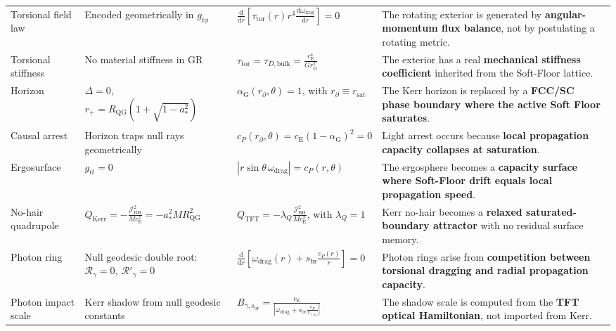 \begin{longtable}{@{} p{3cm} p{4.5cm} p{4.5cm} p{4cm} @{}}
Torsional field law & Encoded geometrically in $g_{t\phi}$ & $\frac{\mathrm{d}}{\mathrm{d}r}\left[\tau_{\mathrm{tor}}(r)r^4\frac{\mathrm{d}\omega_{\mathrm{drag}}}{\mathrm{d}r}\right]=0$ & The rotating exterior is generated by \textbf{angular-momentum flux balance}, not by postulating a rotating metric. \\

Torsional stiffness & No material stiffness in GR & $\tau_{\mathrm{tor}} = \tau_{D,\mathrm{bulk}} = \frac{c_{\mathrm{E}}^4}{G r_{\mathrm{D}}^2}$ & The exterior has a real \textbf{mechanical stiffness coefficient} inherited from the Soft-Floor lattice. \\

Horizon & $\Delta=0$, \newline $r_+=R_{\mathrm{QG}}\left(1+\sqrt{1-a_\ast^2}\right)$ & $\alpha_{\mathrm{G}}(r_{\partial},\theta)=1$, with $r_{\partial}\equiv r_{\mathrm{sat}}$ & The Kerr horizon is replaced by a \textbf{FCC/SC phase boundary where the active Soft Floor saturates}. \\

Causal arrest & Horizon traps null rays geometrically & $c_P(r_{\partial},\theta) = c_{\mathrm{E}}(1-\alpha_{\mathrm{G}})^2 = 0$ & Light arrest occurs because \textbf{local propagation capacity collapses at saturation}. \\

Ergosurface & $g_{tt}=0$ & $\left|r\sin\theta\,\omega_{\mathrm{drag}}\right| = c_P(r,\theta)$ & The ergosphere becomes a \textbf{capacity surface where Soft-Floor drift equals local propagation speed}. \\

No-hair quadrupole & $Q_{\mathrm{Kerr}} = -\frac{\mathcal{J}_{\mathrm{BH}}^2}{M c_{\mathrm{E}}^2} = -a_\ast^2 M R_{\mathrm{QG}}^2$ & $Q_{\mathrm{TFT}} = -\lambda_Q\frac{\mathcal{J}_{\mathrm{BH}}^2}{M c_{\mathrm{E}}^2}$, with $\lambda_Q=1$ & Kerr no-hair becomes a \textbf{relaxed saturated-boundary attractor} with no residual surface memory. \\

Photon ring & Null geodesic double root: $\mathcal{R}_{\gamma}=0,\ \mathcal{R}'_{\gamma}=0$ & $\frac{\mathrm{d}}{\mathrm{d}r}\left[\omega_{\mathrm{drag}}(r)+s_{\mathrm{br}}\frac{c_P(r)}{r}\right]=0$ & Photon rings arise from \textbf{competition between torsional dragging and radial propagation capacity}. \\

Photon impact scale & Kerr shadow from null geodesic constants & $B_{\gamma,s_{\mathrm{br}}} = \frac{c_{\mathrm{E}}}{\left| \omega_{\mathrm{drag}} + s_{\mathrm{br}} \frac{c_P}{r_{\gamma,s_{\mathrm{br}}}} \right|}$ & The shadow scale is computed from the \textbf{TFT optical Hamiltonian}, not imported from Kerr. \\


\end{longtable}
